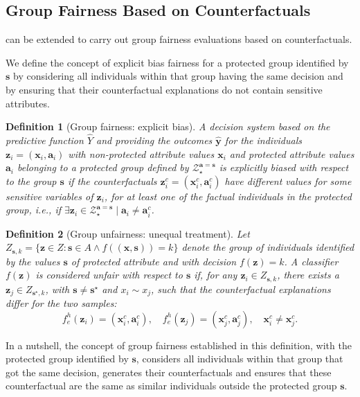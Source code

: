 \documentclass[letterpaper]{article} %
\newtheorem{definition}{Definition}
\begin{document}
\subsection{Group Fairness Based on Counterfactuals}

 can be extended to carry out group fairness evaluations based on counterfactuals.

We define the concept of explicit bias fairness for a protected group identified by $\boldsymbol{s}$ by considering all individuals within that group having the same decision and by ensuring that their counterfactual explanations do not contain sensitive attributes.

\begin{definition}[Group fairness: explicit bias]\label{explicit_bias_group}
	A decision system based on the predictive function $\hat{Y}$ and providing the outcomes $\boldsymbol{\hat{y}}$ for the individuals $\boldsymbol{z}_i = (\boldsymbol{x}_i, \boldsymbol{a}_i)$ with non-protected attribute values $\boldsymbol{x}_{i}$ and protected attribute values $\boldsymbol{a}_{i}$ belonging to a protected group defined by $\mathcal{Z}_\star^{\boldsymbol{a}=\boldsymbol{s}}$ is \emph{explicitly biased} with respect to the group $\boldsymbol{s}$ if the counterfactuals $\boldsymbol{z}_i^c = (\boldsymbol{x}_i^c, \boldsymbol{a}_i^c)$ have different values for some sensitive variables of $\boldsymbol{z}_i$, for at least one of the factual individuals in the protected group, i.e., if $\exists \boldsymbol{z}_i \in \mathcal{Z}_\star^{\boldsymbol{a}=\boldsymbol{s}} \mid \boldsymbol{a}_i \neq \boldsymbol{a}_{i}^{c}$.
\end{definition}

\begin{definition}[Group unfairness: unequal treatment]\label{unequal_treatment_group}
	Let $Z_{\boldsymbol{s}, k} = \{ \boldsymbol{z} \in Z : \boldsymbol{s} \in A \wedge f((\boldsymbol{x}, \boldsymbol{s})) = k \}$ denote the group of individuals identified by the values $\boldsymbol{s}$ of protected attribute and with decision $f(\boldsymbol{z})=k$.
	A classifier $f(\boldsymbol{z})$ is considered unfair with respect to $\boldsymbol{s}$  if, for any $\boldsymbol{z}_i \in Z_{\boldsymbol{s}, k}$, there exists a $\boldsymbol{z}_j \in Z_{\boldsymbol{s}^\star,k}$, with $\boldsymbol{s} \neq \boldsymbol{s}^\star$ and $x_i \sim x_j$, such that the counterfactual explanations differ for the two samples: 
	$$ f_{e}^{h}(\boldsymbol{z}_{i}) = (\boldsymbol{x}_{i}^c, \boldsymbol{a}_{i}^c), \quad f_{e}^{h}(\boldsymbol{z}_{j}) = (\boldsymbol{x}_{j}^{c}, \boldsymbol{a}_{j}^{c}), \quad \boldsymbol{x}_{i}^c \neq \boldsymbol{x}_{j}^{c}.$$ 
\end{definition}
%
\noindent In a nutshell, the concept of group fairness established in this definition, with the protected group identified by $\boldsymbol{s}$, considers all individuals within that group that got the same decision, generates their counterfactuals and ensures that these counterfactual are the same as similar individuals outside the protected group $\boldsymbol{s}$.
\end{document}
